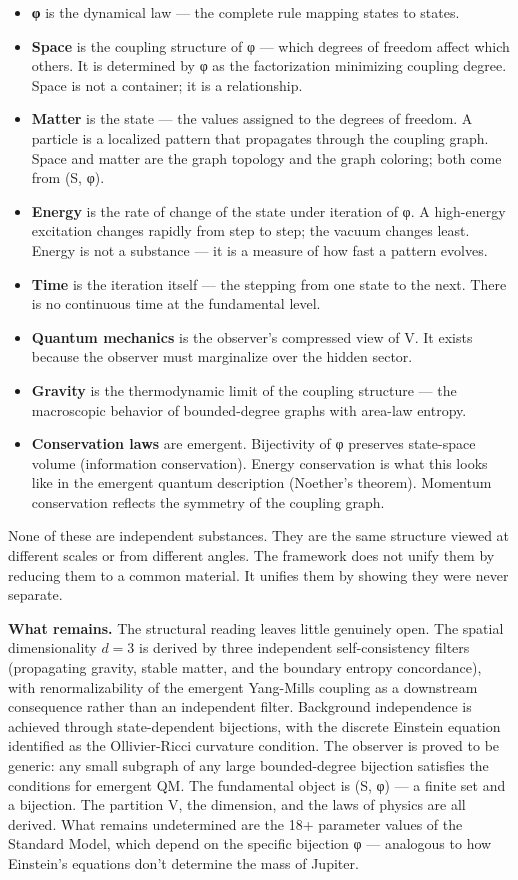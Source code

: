 \documentclass[
]{article}
\providecommand{\tightlist}{%
  \setlength{\itemsep}{0pt}\setlength{\parskip}{0pt}}
\begin{document}
\begin{itemize}
\tightlist
\item
  \textbf{φ} is the dynamical law --- the complete rule mapping states
  to states.
\item
  \textbf{Space} is the coupling structure of φ --- which degrees of
  freedom affect which others. It is determined by φ as the
  factorization minimizing coupling degree. Space is not a container; it
  is a relationship.
\item
  \textbf{Matter} is the state --- the values assigned to the degrees of
  freedom. A particle is a localized pattern that propagates through the
  coupling graph. Space and matter are the graph topology and the graph
  coloring; both come from (S, φ).
\item
  \textbf{Energy} is the rate of change of the state under iteration of
  φ. A high-energy excitation changes rapidly from step to step; the
  vacuum changes least. Energy is not a substance --- it is a measure of
  how fast a pattern evolves.
\item
  \textbf{Time} is the iteration itself --- the stepping from one state
  to the next. There is no continuous time at the fundamental level.
\item
  \textbf{Quantum mechanics} is the observer's compressed view of V. It
  exists because the observer must marginalize over the hidden sector.
\item
  \textbf{Gravity} is the thermodynamic limit of the coupling structure
  --- the macroscopic behavior of bounded-degree graphs with area-law
  entropy.
\item
  \textbf{Conservation laws} are emergent. Bijectivity of φ preserves
  state-space volume (information conservation). Energy conservation is
  what this looks like in the emergent quantum description (Noether's
  theorem). Momentum conservation reflects the symmetry of the coupling
  graph.
\end{itemize}

None of these are independent substances. They are the same structure
viewed at different scales or from different angles. The framework does
not unify them by reducing them to a common material. It unifies them by
showing they were never separate.

\textbf{What remains.} The structural reading leaves little genuinely
open. The spatial dimensionality \(d = 3\) is derived by three
independent self-consistency filters (propagating gravity, stable
matter, and the boundary entropy concordance), with renormalizability of
the emergent Yang-Mills coupling as a downstream consequence rather than
an independent filter. Background independence is achieved through
state-dependent bijections, with the discrete Einstein equation
identified as the Ollivier-Ricci curvature condition. The observer is
proved to be generic: any small subgraph of any large bounded-degree
bijection satisfies the conditions for emergent QM. The fundamental
object is (S, φ) --- a finite set and a bijection. The partition V, the
dimension, and the laws of physics are all derived. What remains
undetermined are the 18+ parameter values of the Standard Model, which
depend on the specific bijection φ --- analogous to how Einstein's
equations don't determine the mass of Jupiter.
\end{document}

